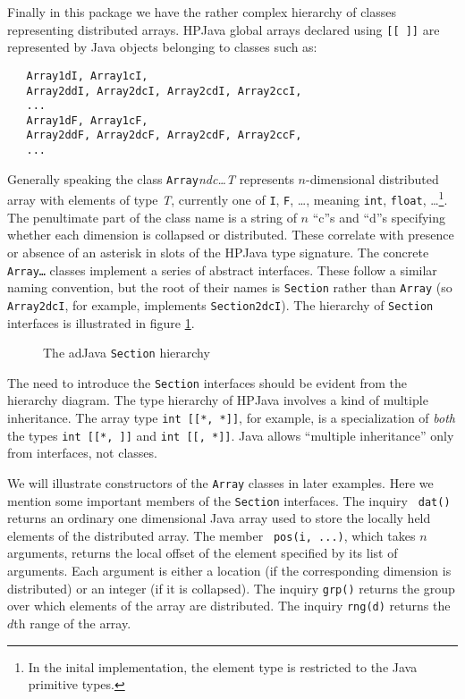 Finally in this package we have the rather complex hierarchy of classes
representing distributed arrays.  HPJava global arrays declared using
\texttt{[[~]]} are represented by Java objects belonging to classes
such as:
\begin{small}
\begin{verbatim}
   Array1dI, Array1cI,
   Array2ddI, Array2dcI, Array2cdI, Array2ccI,
   ...
   Array1dF, Array1cF,
   Array2ddF, Array2dcF, Array2cdF, Array2ccF,
   ...
\end{verbatim}
\end{small}
Generally speaking the class \texttt{Array}\textit{ndc{\ldots}T} represents
$n$-dimensional distributed array with elements of type {\em T},
currently one of {\tt I}, {\tt F}, \ldots, meaning {\tt int},
{\tt float}, \ldots\footnote{In the inital implementation, the element type is
restricted to the Java primitive types.}.
The penultimate part of the class name is a string of
$n$ ``c''s and ``d''s specifying whether each dimension is collapsed
or distributed.  These correlate with presence or absence of an asterisk
in slots of the HPJava type signature.
The concrete {\tt Array\ldots} classes implement a series of abstract
interfaces.  These follow a similar naming convention, but the root of
their names is {\tt Section} rather than {\tt Array} (so {\tt Array2dcI},
for example, implements {\tt Section2dcI}).  The hierarchy of
{\tt Section} interfaces is illustrated in figure \ref{fig:arrays}.
\begin{figure}[htb]
  \begin{center}
    \leavevmode
    \caption{The adJava {\tt Section} hierarchy}
    \label{fig:arrays}
  \end{center}
\end{figure}
The need to introduce the {\tt Section} interfaces should be evident
from the hierarchy diagram.  The type hierarchy of HPJava involves a
kind of multiple inheritance.  The array type {\tt int [[*, *]]}, for
example, is a specialization of {\em both} the types {\tt int [[*, ]]}
and {\tt int [[, *]]}.  Java allows ``multiple inheritance'' only from
interfaces, not classes.

We will illustrate constructors of the {\tt Array} classes in later
examples.  Here we mention some important members of the {\tt Section}
interfaces.  The inquiry {\tt
dat()} returns an ordinary one dimensional Java array used to store the
locally held elements of the distributed array.  The member {\tt
pos(i, ...)}, which takes $n$ arguments, returns the local offset of the
element specified by its list of arguments.  Each argument is either a
location (if the corresponding dimension is distributed) or an integer
(if it is collapsed).  The inquiry {\tt grp()} returns the group over
which elements of the array are distributed.  The inquiry {\tt rng(d)}
returns the $d$th range of the array.

